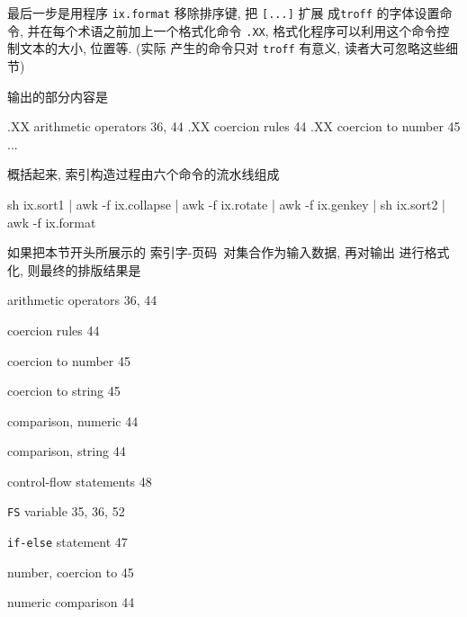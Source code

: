最后一步是用程序 \texttt{ix.format} 移除排序键, 把 \texttt{[...]} 扩展
成\texttt{troff} 的字体设置命令, 并在每个术语之前加上一个格式化命令
\texttt{.XX}, 格式化程序可以利用这个命令控制文本的大小, 位置等. (实际 
产生的命令只对 \texttt{troff} 有意义, 读者大可忽略这些细节)
输出的部分内容是
\begin{awkcode}
    .XX
    arithmetic operators  36, 44
    .XX
    coercion rules  44
    .XX
    coercion to number  45
    ...
\end{awkcode}

概括起来, 索引构造过程由六个命令的流水线组成
\begin{awkcode}
    sh ix.sort1 |
    awk -f ix.collapse |
    awk -f ix.rotate |
    awk -f ix.genkey |
    sh ix.sort2 |
    awk -f ix.format
\end{awkcode}
如果把本节开头所展示的 \mbox{索引字}-页码\ 对集合作为输入数据, 再对输出
进行格式化, 则最终的排版结果是
\begin{pattern}
\indent    arithmetic operators 36, 44\par
\indent    coercion rules 44\par
\indent    coercion to number 45\par
\indent    coercion to string 45\par
\indent    comparison, numeric 44\par
\indent    comparison, string 44\par
\indent    control-flow statements 48\par
\indent    \texttt{FS} variable 35, 36, 52\par
\indent    \texttt{if-else} statement 47\par
\indent    number, coercion to 45\par
\indent    numeric comparison 44\par
\end{pattern}

